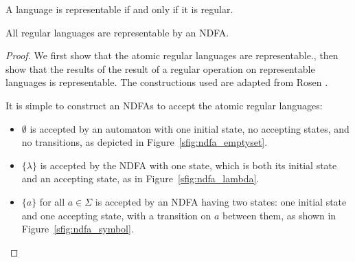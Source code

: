 \documentclass{bcthesis}
\newcommand{\footcite}[2]{\xspace\cite[pg.~{#2}]{#1}\xspace}
\begin{document}
\label{ch:kleenes_theorem}

	\begin{theorem}
		A language is representable if and only if it is regular.
	\end{theorem}

	\begin{claim}
	\label{prop:regular_languages_representable}
		All regular languages are representable by an NDFA.
	\end{claim}
	\begin{proof}
		We first show that the atomic regular languages are representable., then show that the results of the result of a regular operation on representable languages is representable. The constructions used are adapted from Rosen \footcite{rosen}{880--881}.

		It is simple to construct an NDFAs to accept the atomic regular languages:
		\begin{itemize}
			\item [] $\emptyset$ is accepted by an automaton with one initial state, no accepting states, and no transitions, as depicted in Figure~\ref{sfig:ndfa_emptyset}.
			\item [] $\{ \lambda \}$ is accepted by the NDFA with one state, which is both its initial state and an accepting state, as in Figure~\ref{sfig:ndfa_lambda}.
			\item [] $\{ a \}$ for all $a \in \Sigma$ is accepted by an NDFA having two states: one initial state and one accepting state, with a transition on $a$ between them, as shown in Figure~\ref{sfig:ndfa_symbol}.
		\end{itemize}



\end{proof}
\end{document}
